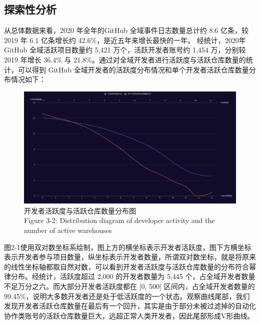 \subsection{探索性分析}
\par 从总体数据来看，2020 年全年的GitHub 全域事件日志数量总计约 8.6 亿条，较 2019 年 6.1 亿条增长约 42.6\%，是近五年来增长最快的一年。
经统计，2020年GitHub 全域活跃项目数量约 5,421 万个，活跃开发者账号约 1,454 万，分别较 2019 年增长 36.4\% 与 21.8\%。通过对全域开发者进行活跃度与活跃仓库数量的统计，可以得到 GitHub 全域开发者的活跃度分布情况和单个开发者活跃仓库数量分布情况如下：
\begin{figure}[H]
    \centering
    \includegraphics[width=130mm]{./figures/image2-1.png}
    \caption{开发者活跃度与活跃仓库数量分布图\\Figure 3-2: Distribution diagram of developer activity and the number of active warehouses}
\end{figure}

\par 图2-1使用双对数坐标系绘制，图上方的横坐标表示开发者活跃度，图下方横坐标表示开发者参与项目数量，纵坐标表示开发者数量，所谓双对数坐标，就是将原来的线性坐标轴都取自然对数，可以看到开发者活跃度与活跃仓库数量的分布符合幂律分布。经统计，活跃度超过 2,000 的开发者数量为 5,445 个，占全域开发者数量不足万分之六。而大部分开发者活跃度都在 [0, 500] 区间内，占全域开发者数量的 99.45\%，说明大多数开发者还是处于低活跃度的一个状态。观察曲线尾部，我们发现开发者活跃仓库数量在最后有一个回升，其实是由于部分未被过滤掉的自动化协作类账号的活跃仓库数量巨大，远超正常人类开发者，因此尾部形成V形曲线。

